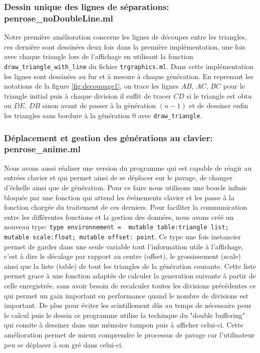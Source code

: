 \documentclass[a4paper,13pt]{article}
\begin{document}
\subsubsection{Dessin unique des lignes de séparations: penrose\_noDoubleLine.ml}
Notre première amélioration concerne les lignes de découpes entre les triangles, ces dernière sont dessinées deux fois dans la première implémentation, une fois avec chaque triangle lors de l'affichage en utilisant la fonction \texttt{draw_triangle_with_line} du fichier \texttt{trgraphics.ml}. Dans cette implémentation les lignes sont dessinées au fur et à mesure à chaque génération. En reprenant les notations de la figure \ref{fig:decoupage1}, on trace les lignes $AB$, $AC$, $BC$ pour le triangle initial puis à chaque division il suffit de tracer $CD$ si le triangle est obtu ou $DE$, $DB$ sinon avant de passer à la génération $(n-1)$ et de dessiner enfin les triangles sans bordure à la génération $0$ avec \texttt{draw_triangle}.

\subsubsection{Déplacement et gestion des générations au clavier: penrose\_anime.ml}

Nous avons aussi réaliser une version du programme qui est capable de réagir au entrées clavier et qui permet ainsi de se déplacer sur le pavage, de changer d'échelle ainsi que de génération. Pour ce faire nous utilisons une boucle infinie bloquée par une fonction qui attend les évènements clavier et les passe à la fonction chargée du traitement de ces derniers. Pour faciliter la communication entre les différentes fonctions et la gestion des données, nous avons créé un nouveau type: \texttt{type environnement = { mutable table:triangle list; mutable scale:float; mutable offset: point}}. Ce type une fois instancier permet de garder dans une seule variable tout l'information utile à l'affichage, c'est à dire le décalage par rapport au centre (offset), le grossissement (scale) ainsi que la liste (table) de tout les triangles de la génération courante. Cette liste permet grace à une fonction adaptée de calculer la generation suivante à partir de celle enregistrée, sans avoir besoin de recalculer toutes les divisions précédentes ce qui permet un gain important en performance quand le nombre de divisions est important. De plus pour éviter les scintillement dûs au temps de nécessaire pour le calcul puis le dessin ce programme utilise la techinque du "double buffering" qui consite à dessiner dans une mémoire tampon puis à afficher celui-ci. Cette amélioration permet de mieux comprendre le processus de pavage car l'utilisateur peu se déplacer à son gré dans celui-ci.
\end{document}
